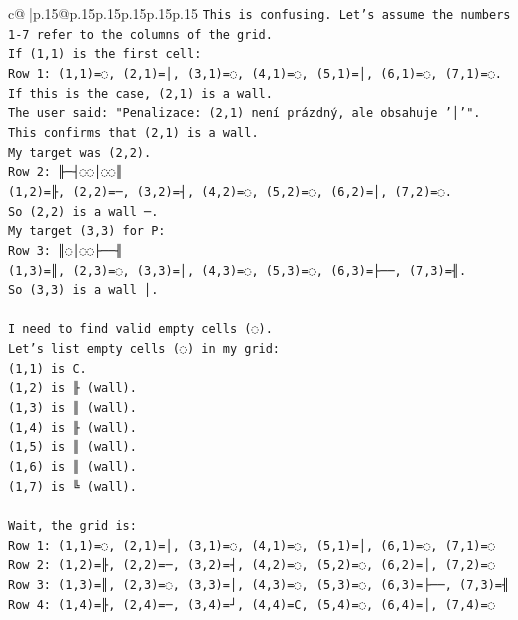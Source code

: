 \documentclass{article}
\begin{document}
{\begin{supertabular}{c@{$\;$}|p{.15\linewidth}@{}p{.15\linewidth}p{.15\linewidth}p{.15\linewidth}p{.15\linewidth}p{.15\linewidth}}
{{{\texttt{This is confusing. Let's assume the numbers 1{-}7 refer to the columns of the grid.} \\
\texttt{If (1,1) is the first cell:} \\
\texttt{Row 1: (1,1)=◌, (2,1)=│, (3,1)=◌, (4,1)=◌, (5,1)=│, (6,1)=◌, (7,1)=◌.} \\
\texttt{If this is the case, (2,1) is a wall.} \\
\texttt{The user said: "Penalizace: (2,1) není prázdný, ale obsahuje '│'".} \\
\texttt{This confirms that (2,1) is a wall.} \\
\texttt{My target was (2,2).} \\
\texttt{Row 2: ╟─┤◌◌│◌◌║} \\
\texttt{(1,2)=╟, (2,2)=─, (3,2)=┤, (4,2)=◌, (5,2)=◌, (6,2)=│, (7,2)=◌.} \\
\texttt{So (2,2) is a wall ─.} \\
\texttt{My target (3,3) for P:} \\
\texttt{Row 3: ║◌│◌◌├──╢} \\
\texttt{(1,3)=║, (2,3)=◌, (3,3)=│, (4,3)=◌, (5,3)=◌, (6,3)=├──, (7,3)=╢.} \\
\texttt{So (3,3) is a wall │.} \\
\\ 
\texttt{I need to find valid empty cells (◌).} \\
\texttt{Let's list empty cells (◌) in my grid:} \\
\texttt{(1,1) is C.} \\
\texttt{(1,2) is ╟ (wall).} \\
\texttt{(1,3) is ║ (wall).} \\
\texttt{(1,4) is ╟ (wall).} \\
\texttt{(1,5) is ║ (wall).} \\
\texttt{(1,6) is ║ (wall).} \\
\texttt{(1,7) is ╚ (wall).} \\
\\ 
\texttt{Wait, the grid is:} \\
\texttt{Row 1: (1,1)=◌, (2,1)=│, (3,1)=◌, (4,1)=◌, (5,1)=│, (6,1)=◌, (7,1)=◌} \\
\texttt{Row 2: (1,2)=╟, (2,2)=─, (3,2)=┤, (4,2)=◌, (5,2)=◌, (6,2)=│, (7,2)=◌} \\
\texttt{Row 3: (1,3)=║, (2,3)=◌, (3,3)=│, (4,3)=◌, (5,3)=◌, (6,3)=├──, (7,3)=╢} \\
\texttt{Row 4: (1,4)=╟, (2,4)=─, (3,4)=┘, (4,4)=C, (5,4)=◌, (6,4)=│, (7,4)=◌} \\
}}}
\end{supertabular}}
\end{document}
